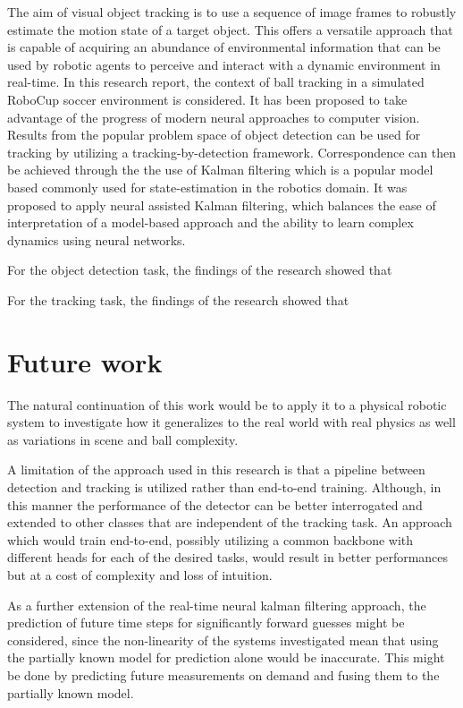 \documentclass[a4paper,twoside,12pt]{report}
\begin{document}
The aim of visual object tracking is to use a sequence of image frames to robustly estimate the motion state of a target object. This offers a versatile approach that is capable of acquiring an abundance of environmental information that can be used by robotic agents to perceive and interact with a dynamic environment in real-time. In this research report, the context of ball tracking in a simulated RoboCup soccer environment is considered. It has been proposed to take advantage of the progress of modern neural approaches to computer vision. Results from the popular problem space of object detection can be used for tracking by utilizing a tracking-by-detection framework. Correspondence can then be achieved through the the use of Kalman filtering which is a popular model based commonly used for state-estimation in the robotics domain. It was proposed to apply neural assisted Kalman filtering, which balances the ease of interpretation of a model-based approach and the ability to learn complex dynamics using neural networks. 

For the object detection task, the findings of the research showed that

For the tracking task, the findings of the research showed that

\section{Future work}

The natural continuation of this work would be to apply it to a physical robotic system to investigate how it generalizes to the real world with real physics as well as variations in scene and ball complexity.

A limitation of the approach used in this research is that a pipeline between detection and tracking is utilized rather than end-to-end training. Although, in this manner the performance of the detector can be better interrogated and extended to other classes that are independent of the tracking task. An approach which would train end-to-end, possibly utilizing a common backbone with different heads for each of the desired tasks, would result in better performances but at a cost of complexity and loss of intuition.

As a further extension of the real-time neural kalman filtering approach, the prediction of future time steps for significantly forward guesses might be considered, since the non-linearity of the systems investigated mean that using the partially known model for prediction alone would be inaccurate. This might be done by predicting future measurements on demand and fusing them to the partially known model.
\end{document}
